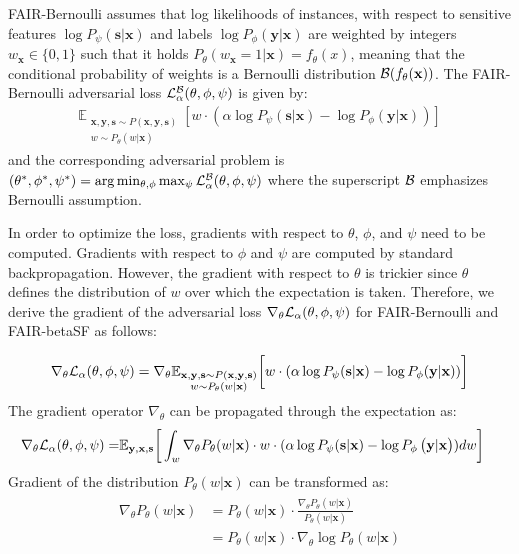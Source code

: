 \documentclass[preprint,12pt]{elsarticle}
\begin{document}
FAIR-Bernoulli assumes that log likelihoods of instances, with respect to sensitive features $\log P_{\psi}(\mathbf{s}|\mathbf{x})$ and labels $\log P_{\phi}(\mathbf{y}|\mathbf{x})$ are weighted by integers $w_\mathbf{x} \in \{0,1\}$ such that it holds $P_\theta(w_\mathbf{x}=1|\mathbf{x})=f_\theta(x)$, meaning that the conditional probability of weights is a Bernoulli distribution ${\cal B}(f_\theta(\mathbf{x}))$. The FAIR-Bernoulli adversarial loss ${\cal L}^{\cal B}_{\alpha}(\theta, \phi, \psi)$ is given by:
\begin{gather}
\label{Eq:Loss_prob}
\mathbb{E}_{\substack{\mathbf{x},\mathbf{y}, \mathbf{s} \sim P\left(\mathbf{x},\mathbf{y}, \mathbf{s}\right)\\w \sim P_\theta(w|\mathbf{x})}}  \left[ w \cdot(\alpha\log P_{\psi}\left(\mathbf{s}|\mathbf{x}\right)
-  \log P_{\phi}\left(\mathbf{y}|\mathbf{x}\right))\right]
\end{gather}
and the corresponding adversarial problem is $(\theta^*,\phi^*,\psi^*) = \arg\min_{\theta,\phi}\max_{\psi}{\cal L}^{\cal B}_\alpha(\theta,\phi,\psi)$
where the superscript ${\cal B}$ emphasizes Bernoulli assumption.

In order to optimize the loss, gradients with respect to $\theta$, $\phi$, and $\psi$ need to be computed. Gradients with respect to $\phi$ and $\psi$ are computed by standard backpropagation. However, the gradient with respect to $\theta$ is trickier since $\theta$ defines the distribution of $w$ over which the expectation is taken. Therefore, we derive the gradient of the adversarial loss $\nabla_{\theta}{\cal L}_{\alpha}(\theta, \phi, \psi)$ for FAIR-Bernoulli and FAIR-betaSF as follows:

\begin{equation}
\nabla_{\theta}{\cal L}_{\alpha}(\theta, \phi, \psi) = \nabla_{\theta} \mathbb{E}_{\substack{\mathbf{x},\mathbf{y}, \mathbf{s} \sim P(\mathbf{x},\mathbf{y}, \mathbf{s})\\w \sim P_\theta(w|\mathbf{x})}} \bigg[ w \cdot ( \alpha \log P_{\psi}(\mathbf{s}|\mathbf{x}) - \log P_{\phi}(\mathbf{y}|\mathbf{x}))\bigg]
\end{equation}
The gradient operator $\nabla_{\theta}$ can be propagated through the expectation as:
\begin{align}
\begin{split}
\nabla_{\theta}{\cal L}_{\alpha}(\theta, \phi, \psi) =& \mathbb{E}_{\mathbf{y},\mathbf{x},\mathbf{s}} \bigg[ \int_w \nabla_{\theta}  P_\theta(w|\mathbf{x}) \cdot w \cdot ( \alpha \log P_{\psi}(\mathbf{s}|\mathbf{x}) - \log P_{\phi}\left(\mathbf{y}|\mathbf{x}\right))dw \bigg]
\end{split}
\end{align}
Gradient of the distribution $P_\theta(w|\mathbf{x})$ can be transformed as:
\begin{align}
\begin{split}
\nabla_{\theta}  P_\theta(w|\mathbf{x}) &= P_\theta(w|\mathbf{x}) \cdot \frac{\nabla_{\theta}P_\theta(w|\mathbf{x}) }{ P_\theta(w|\mathbf{x})}
\\
&= P_\theta(w|\mathbf{x}) \cdot \nabla_{\theta} \log P_\theta(w|\mathbf{x})
\end{split}
\end{align}
\end{document}
